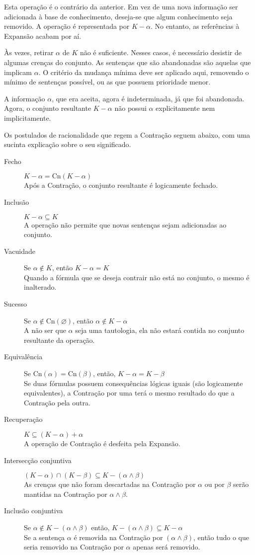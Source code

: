 Esta operação é o contrário da anterior. Em vez de uma nova informação ser adicionada à base de conhecimento, deseja-se que algum conhecimento seja removido. A operação é representada por $ K - \alpha $. No entanto, as referências à Expansão acabam por aí.

Às vezes, retirar $ \alpha $ de $ K $ não é suficiente. Nesses casos, é necessário desistir de algumas crenças do conjunto. As sentenças que são abandonadas são aquelas que implicam $ \alpha $. O critério da mudança mínima deve ser aplicado aqui, removendo o mínimo de sentenças possível, ou as que possuem prioridade menor.

A informação $ \alpha $, que era aceita, agora é indeterminada, já que foi abandonada. Agora, o conjunto resultante $ K - \alpha $ não possui $ \alpha $ explicitamente nem implicitamente. 

Os postulados de racionalidade que regem a Contração seguem abaixo, com uma sucinta explicação sobre o seu significado.

\begin{description}
	\item[Fecho] $ K - \alpha = \text{Cn}(K - \alpha) $ \\ Após a Contração, o conjunto resultante é logicamente fechado.
	\item[Inclusão] $ K - \alpha \subseteq K$ \\ A operação não permite que novas sentenças sejam adicionadas ao conjunto.
	\item[Vacuidade] Se $ \alpha \notin K $, então $ K - \alpha = K $ \\ Quando a fórmula que se deseja contrair não está no conjunto, o mesmo é inalterado.
	\item[Sucesso] Se $ \alpha \notin \text{Cn}(\varnothing) $, então $ \alpha \notin K - \alpha $ \\ A não ser que $ \alpha $ seja uma tautologia, ela não estará contida no conjunto resultante da operação.
	\item[Equivalência] Se $ \text{Cn}(\alpha) = \text{Cn}(\beta) $, então, $ K - \alpha = K - \beta $ \\ Se duas fórmulas possuem consequências lógicas iguais (são logicamente equivalentes), a Contração por uma terá o mesmo resultado do que a Contração pela outra.
	\item[Recuperação] $ K \subseteq (K - \alpha) + \alpha $ \\ A operação de Contração é desfeita pela Expansão.
	\item[Intersecção conjuntiva] $ (K - \alpha) \cap (K - \beta) \subseteq K - (\alpha \land \beta) $ \\ As crenças que não foram descartadas na Contração por $ \alpha $ ou por $ \beta $ serão mantidas na Contração por $ \alpha \land \beta $.
	\item[Inclusão conjuntiva] Se $ \alpha \notin K - (\alpha \land \beta) $ então, $ K - (\alpha \land \beta) \subseteq K - \alpha $ \\ Se a sentença $ \alpha $ é removida na Contração por $  (\alpha \land \beta) $, então tudo o que seria removido na Contração por $ \alpha $ apenas será removido. 
\end{description}

